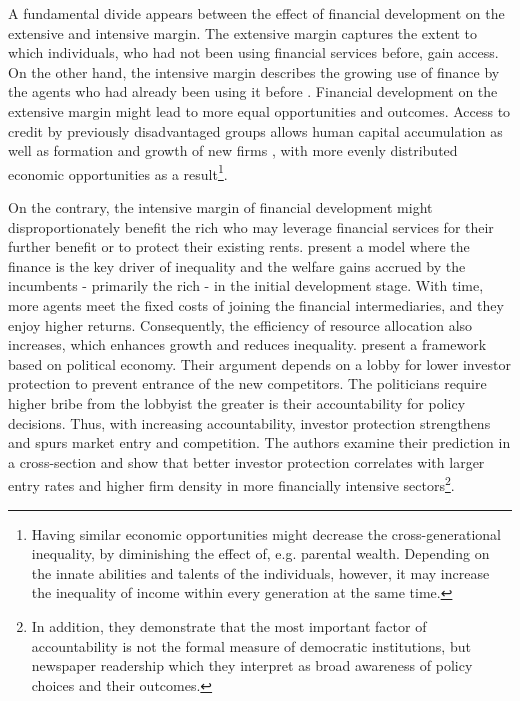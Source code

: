 \documentclass[preprint, nonatbib, 10pt]{elsarticle}
\begin{document}
A fundamental divide appears between the effect of financial development on the extensive and intensive margin. The extensive margin captures the extent to which individuals, who had not been using financial services before, gain access. On the other hand, the intensive margin describes the growing use of finance by the agents who had already been using it before \parencite{demirgucc2009finance}. Financial development on the extensive margin might lead to more equal opportunities and outcomes. Access to credit by previously disadvantaged groups allows human capital accumulation \parencite{galorzeira1993income, galormoav2004, braunetal2019} as well as formation and growth of new firms \parencite{evans1989estimated, banerjeenewman1990}, with more evenly distributed economic opportunities as a result\footnote{Having similar economic opportunities might decrease the cross-generational inequality, by diminishing the effect of, e.g. parental wealth. Depending on the innate abilities and talents of the individuals, however, it may increase the inequality of income within every generation at the same time.}.

On the contrary, the intensive margin of financial development might disproportionately benefit the rich who may leverage financial services for their further benefit or to protect their existing rents. \textcite{GreenwoodJovanovic1990} present a model where the finance is the key driver of inequality and the welfare gains accrued by the incumbents - primarily the rich - in the initial development stage. With time, more agents meet the fixed costs of joining the financial intermediaries, and they enjoy higher returns. Consequently, the efficiency of resource allocation also increases, which enhances growth and reduces inequality. \textcite{perotti2007investor} present a framework based on political economy. Their argument depends on a lobby for lower investor protection to prevent entrance of the new competitors. The politicians require higher bribe from the lobbyist the greater is their accountability for policy decisions. Thus, with increasing accountability, investor protection strengthens and spurs market entry and competition. The authors examine their prediction in a cross-section and show that better investor protection correlates with larger entry rates and higher firm density in more financially intensive sectors\footnote{In addition, they demonstrate that the most important factor of accountability is not the formal measure of democratic institutions, but newspaper readership which they interpret as broad awareness of policy choices and their outcomes.}. 
\end{document}
